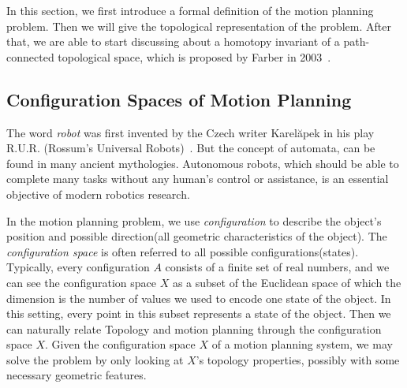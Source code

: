 In this section, we first introduce a formal definition of the motion planning problem. Then we will give the topological representation of the problem. After that, we are able to start discussing about a homotopy invariant of a path-connected topological space, which is proposed by Farber in 2003~\cite{DBLP:journals/dcg/Farber03}.

\subsection{Configuration Spaces of Motion Planning}
The word \textit{robot} was first invented by the Czech writer Karel\u{a}pek in his play R.U.R. (Rossum's Universal Robots)~\cite{zunt2002did}. But the concept of automata, can be found in many ancient mythologies. Autonomous robots, which should be able to complete many tasks without any human's control or assistance, is an essential objective of modern robotics research.

In the motion planning problem, we use \textit{configuration} to describe the object's position and possible direction(all geometric characteristics of the object).
The \textit{configuration space} is often referred to all possible configurations(states).
Typically, every configuration \(A\) consists of a finite set of real numbers, and we can see the configuration space \(X\) as a subset of the Euclidean space of which the dimension is the number of values we used to encode one state of the object.
In this setting, every point in this subset represents a state of the object.
Then we can naturally relate Topology and motion planning through the configuration space \(X\).
Given the configuration space \(X\) of a motion planning system, we may solve the problem by only looking at \(X\)'s topology properties, possibly with some necessary geometric features.

